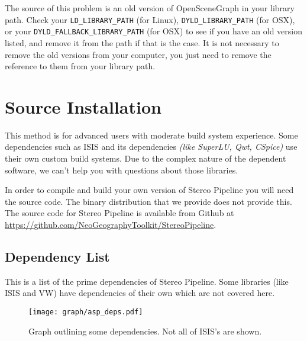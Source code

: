 The source of this problem is an old version of OpenSceneGraph in
your library path. Check your \verb#LD_LIBRARY_PATH# (for Linux),
\verb#DYLD_LIBRARY_PATH# (for OSX), or your \verb#DYLD_FALLBACK_LIBRARY_PATH#
(for OSX) to see if you have an old version listed, and remove it
from the path if that is the case. It is not necessary to remove the
old versions from your computer, you just need to remove the reference
to them from your library path.

\newpage

\section{\label{sec:Source-Installation}Source Installation}

This method is for advanced users with moderate build system
experience. Some dependencies such as ISIS and its dependencies
\emph{(like SuperLU, Qwt, CSpice)} use their own custom build systems.
Due to the complex nature of the dependent software, we can't help you
with questions about those libraries.

In order to compile and build your own version of Stereo Pipeline you
will need the source code. The binary distribution that we provide
does not provide this. The source code for Stereo Pipeline is
available from Github at
\url{https://github.com/NeoGeographyToolkit/StereoPipeline}.

\subsection{Dependency List}

This is a list of the prime dependencies of Stereo Pipeline. Some libraries
(like \ac{ISIS} and \ac{VW}) have dependencies of their own which are not covered here.

\begin{figure}[h]
  \centering
  \texttt{[image: graph/asp\_deps.pdf]}
  \caption{Graph outlining some dependencies. Not all of ISIS's are shown.}
\end{figure}

